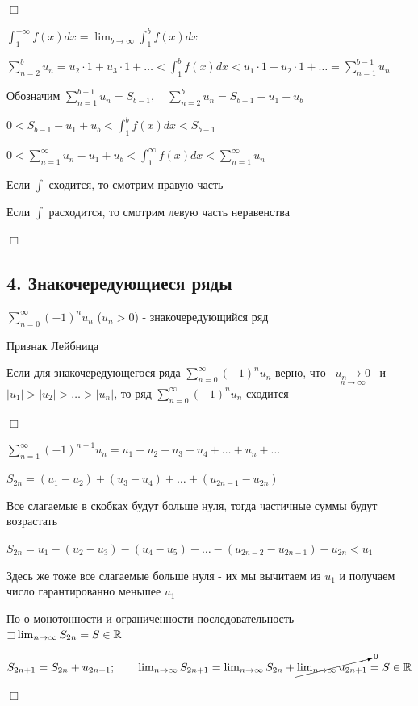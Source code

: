 \documentclass[12pt]{article}
\begin{document}
    \begin{MyProof}
        $\Box$

        $\int_1^{+\infty} f(x) dx = \lim_{b \to \infty} \int_1^b f(x) dx$

        $\sum_{n = 2}^b u_n = u_2 \cdot 1 + u_3 \cdot 1 + \dots < \int_1^b f(x) dx < u_1 \cdot 1 + u_2 \cdot 1 + \dots = \sum_{n = 1}^{b - 1} u_n$

        Обозначим $\sum_{n = 1}^{b - 1} u_n = S_{b - 1}, \quad \sum_{n = 2}^{b} u_n = S_{b - 1} - u_1 + u_b$

        $0 < S_{b - 1} - u_1 + u_b < \int_1^b f(x) dx < S_{b - 1}$

        $0 < \sum_{n = 1}^{\infty} u_n - u_1 + u_b < \int_1^\infty f(x) dx < \sum_{n = 1}^\infty u_n$

        Если $\int$ сходится, то смотрим правую часть

        Если $\int$ расходится, то смотрим левую часть неравенства

        $\Box$
    \end{MyProof}

    \subsection{4. Знакочередующиеся ряды}

    \Def $\sum_{n = 0}^\infty (-1)^n u_n$ ($u_n > 0$) - знакочередующийся ряд

    \begin{MyTheorem}
        \Ths Признак Лейбница

        Если для знакочередующегося ряда $\sum_{n = 0}^\infty (-1)^n u_n$ верно,
        что \ $\underset{n \to \infty}{u_n \to 0}$ \ и \ $|u_1| > |u_2| > \dots > |u_n|$,
        то ряд $\sum_{n = 0}^\infty (-1)^n u_n$ сходится
    \end{MyTheorem}


    \begin{MyProof}
        $\Box$

        $\sum_{n = 1}^\infty (-1)^{n + 1} u_n = u_1 - u_2 + u_3 - u_4 + \dots + u_n + \dots$

        $S_{2n} = (u_1 - u_2) + (u_3 - u_4) + \dots + (u_{2n - 1} - u_{2n})$

        Все слагаемые в скобках будут больше нуля, тогда частичные суммы будут возрастать

        $S_{2n} = u_1 - (u_2 - u_3) - (u_4 - u_5) - \dots - (u_{2n - 2} - u_{2n - 1}) - u_{2n} < u_1$

        Здесь же тоже все слагаемые больше нуля - их мы вычитаем из $u_1$ и получаем число гарантированно меньшее $u_1$

        По \Ths о монотонности и ограниченности последовательность $\mathord{\sqsupset} \lim_{n \to \infty} S_{2n} = S \in \mathbb{R}$

        $S_{2n + 1} = S_{2n} + u_{2n + 1}; \qquad \lim_{n \to \infty} S_{2n + 1} = \lim_{n \to \infty} S_{2n} + \cancelto{0}{\lim_{n \to \infty} u_{2n + 1}} = S \in \mathbb{R}$

        $\Box$
    \end{MyProof}
\end{document}
